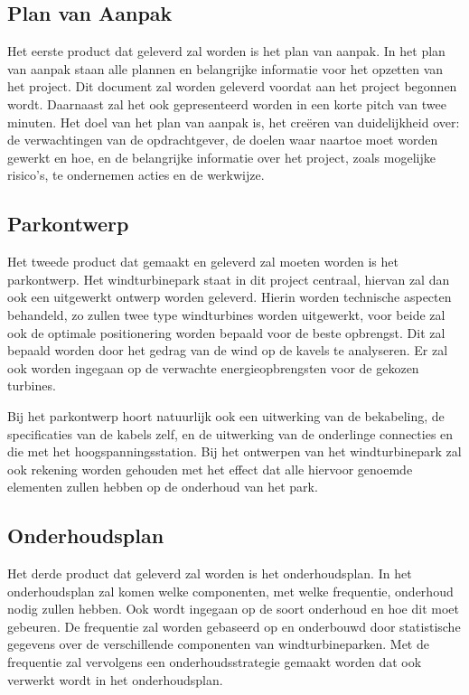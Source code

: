 \subsection{Plan van Aanpak}
Het eerste product dat geleverd zal worden is het plan van aanpak. In het plan van aanpak staan alle plannen en belangrijke informatie voor het opzetten van het project. Dit document zal worden geleverd voordat aan het project begonnen wordt. Daarnaast zal het ook gepresenteerd worden in een korte pitch van twee minuten. Het doel van het plan van aanpak is, het creëren van duidelijkheid over: de verwachtingen van de opdrachtgever, de doelen waar naartoe moet worden gewerkt en hoe, en de belangrijke informatie over het project, zoals mogelijke risico's, te ondernemen acties en de werkwijze. 

\subsection{Parkontwerp}
Het tweede product dat gemaakt en geleverd zal moeten worden is het parkontwerp. Het windturbinepark staat in dit project centraal, hiervan zal dan ook een uitgewerkt ontwerp worden geleverd. Hierin worden technische aspecten behandeld, zo zullen twee type windturbines worden uitgewerkt, voor beide zal ook de optimale positionering worden bepaald voor de beste opbrengst. Dit zal bepaald worden door het gedrag van de wind op de kavels te analyseren. Er zal ook worden ingegaan op de verwachte energieopbrengsten voor de gekozen turbines. 

Bij het parkontwerp hoort natuurlijk ook een uitwerking van de bekabeling, de specificaties van de kabels zelf, en de uitwerking van de onderlinge connecties en die met het hoogspanningsstation. Bij het ontwerpen van het windturbinepark zal ook rekening worden gehouden met het effect dat alle hiervoor genoemde elementen zullen hebben op de onderhoud van het park. 

\subsection{Onderhoudsplan}
Het derde product dat geleverd zal worden is het onderhoudsplan. In het onderhoudsplan zal komen welke componenten, met welke frequentie, onderhoud nodig zullen hebben. Ook wordt ingegaan op de soort onderhoud en hoe dit moet gebeuren. De frequentie zal worden gebaseerd op en onderbouwd door statistische gegevens over de verschillende componenten van windturbineparken. Met de frequentie zal vervolgens een onderhoudsstrategie gemaakt worden dat ook verwerkt wordt in het onderhoudsplan. 

